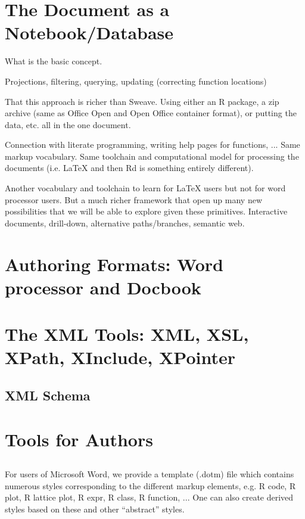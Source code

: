 \documentclass{article}
\begin{document}
\section{The Document as a Notebook/Database}

What is the basic concept.

Projections, filtering, querying, updating (correcting function
locations)

That this approach is richer than Sweave.
Using either an R package, a zip archive (same as Office Open and Open
Office container format), or putting the data, etc. all in the one document.


Connection with literate programming, writing help pages for
functions, ...  Same markup vocabulary.  Same toolchain and
computational model for processing the documents (i.e. LaTeX and then
Rd is something entirely different).

Another vocabulary and toolchain to learn for \LaTeX{} users
but not for word processor users. But a much richer framework
that open up many new possibilities that we will be able to 
explore given these primitives. Interactive documents, drill-down,
alternative paths/branches,  semantic web.

\section{Authoring Formats: Word processor and Docbook}

\section{The XML Tools: XML, XSL, XPath, XInclude, XPointer}

\subsection{XML Schema}

\section{Tools for Authors}

\subsection{}
For users of Microsoft Word, we provide
a template (.dotm) file which contains numerous styles
corresponding to the different markup elements, e.g. R code,
R plot, R lattice plot, R expr, R class, R function, ...
One can also create derived styles based on these and other
``abstract'' styles.
\end{document}
